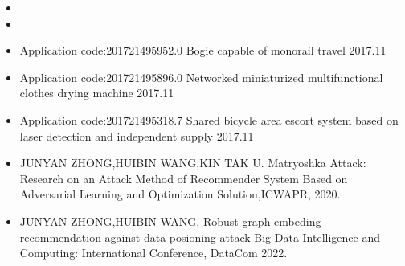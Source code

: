 \newpage
{}
  \begin{itemize}[leftmargin=*]
    \item {}
    \item {}
    
  \end{itemize}
  \begin{itemize}[leftmargin=*]
    \item{Application code:201721495952.0 Bogie capable of monorail travel 2017.11}
    \item {Application code:201721495896.0 Networked miniaturized multifunctional 
clothes drying machine 2017.11}
    \item {Application code:201721495318.7 Shared bicycle area escort system based 
on laser detection and independent supply 2017.11}
     \item {JUNYAN ZHONG,HUIBIN WANG,KIN TAK U. Matryoshka Attack: Research on an Attack Method of Recommender System Based on Adversarial Learning and Optimization Solution,ICWAPR, 2020. } 
     \item{JUNYAN ZHONG,HUIBIN WANG, Robust graph embeding recommendation against data posioning attack Big Data Intelligence and Computing: International Conference, DataCom 2022.}
  \end{itemize}